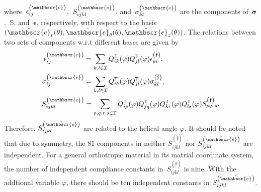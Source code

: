 \documentclass[preprint,10pt,times]{elsarticle}
\numberwithin{equation}{section}
\newcommand{\physe}{\hat{\mathbscr{e}}} %
\newcommand{\physf}{\hat{\boldsymbol{\mathfrak{f}}}}
\renewcommand{\u}[1]{\boldsymbol{#1}}
\newcommand{\usf}[1]{\u{\mathsf #1}}
\newcommand{\pr}[1]{\left( #1 \right)}
\renewcommand{\>}{$\Rightarrow$}
\begin{document}
where~$\epsilon_{ij}^{\pr{\physe}}$,~$S_{ijkl}^{\pr{\physe}}$, and~$\sigma_{kl}^{\pr{\physe}}$ are the components of~$\u{\sigma}$,~$\mathbb{S}$, and~$\u{\epsilon}$, respectively, with respect to the basis~$(\physe_{r}(\theta),\physe_{\theta}(\theta),\physe_{z}(\theta))$. The relations between two sets of components w.r.t different bases are given by
\begin{align}
\epsilon_{ij}^{\pr{\physe}} & = \sum_{k,l \in \mathcal{I}} Q^{\sf {T}}_{ik} (\varphi) Q^{\sf {T}}_{jl} (\varphi) \epsilon_{kl}^{\pr{\physf}} , \\
\sigma_{ij}^{\pr{\physe}} & = \sum_{k,l \in \mathcal{I}} Q^{\sf {T}}_{ik}(\varphi) Q^{\sf {T}}_{jl}(\varphi) \sigma_{kl}^{\pr{\physf}} , \\
S_{ijkl}^{\pr{\physe}} & = \sum_{p,q,r,s \in \mathcal{I}} Q^{\sf {T}}_{ip}(\varphi) Q^{\sf {T}}_{jq}(\varphi) Q^{\sf {T}}_{kr}(\varphi) Q^{\sf {T}}_{ls}(\varphi) S_{pqrs}^{\pr{\physf}}.
\end{align}
Therefore, $S_{ijkl}^{\pr{\physe}}$ are related to the helical angle $\varphi$.
It should be noted that due to symmetry, the 81 components in neither $S_{ijkl}^{\pr{\physf}}$ nor $S_{ijkl}^{\pr{\physe}}$ are independent.
For a general orthotropic material in its matrial coordinate system, the number of independent compliance constants in~$S_{ijkl}^{\pr{\physf}}$ is nine.
With the addtional variable $\varphi$, there should be ten independent constants in $S_{ijkl}^{\pr{\physe}}$.
\end{document}
